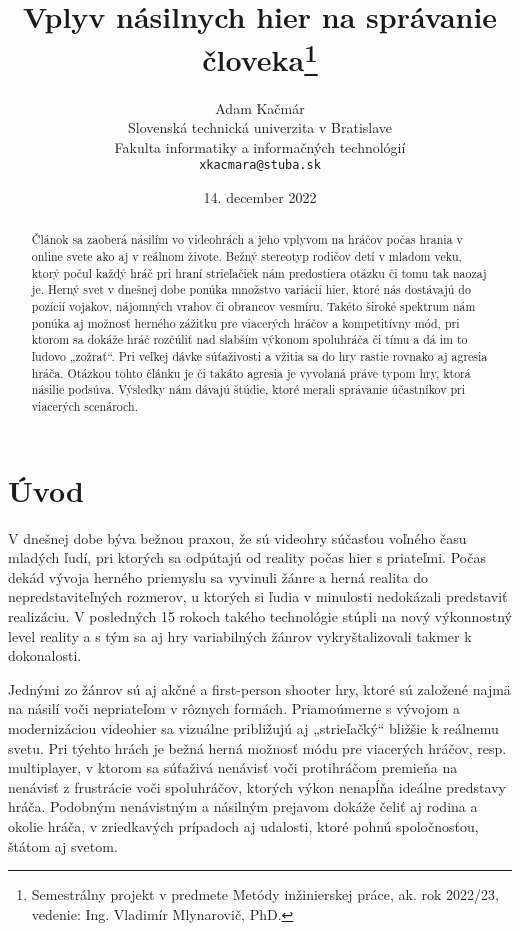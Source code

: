 \documentclass[10pt,twoside,slovak,a4paper]{article}
\title{Vplyv násilnych hier na správanie človeka\thanks{Semestrálny projekt v predmete Metódy inžinierskej práce, ak. rok 2022/23, vedenie: Ing. Vladimír Mlynarovič, PhD.}} %
\author{Adam Kačmár\\[2pt]
	{\small Slovenská technická univerzita v Bratislave}\\
	{\small Fakulta informatiky a informačných technológií}\\
	{\small \texttt{xkacmara@stuba.sk}}
	}
\date{\small 14. december 2022} %
\begin{document}
\maketitle

\begin{abstract}
Článok sa zaoberá násilím vo videohrách a jeho vplyvom na hráčov počas hrania v online svete ako aj v reálnom živote. Bežný stereotyp rodičov detí v mladom veku, ktorý počul každý hráč pri hraní strieľačiek nám predostiera otázku či tomu tak naozaj je. Herný svet v dnešnej dobe ponúka množstvo variácií hier, ktoré nás dostávajú do pozícií vojakov, nájomných vrahov či obrancov vesmíru. Takéto široké spektrum nám ponúka aj možnosť herného zážitku pre viacerých hráčov a kompetitívny mód, pri ktorom sa dokáže hráč rozčúliť nad slabším výkonom spoluhráča či tímu a dá im to ľudovo „zožrať“. Pri veľkej dávke súťaživosti a vžitia sa do hry rastie rovnako aj agresia hráča. Otázkou tohto článku je či takáto agresia je vyvolaná práve typom hry, ktorá násilie podsúva. Výsledky nám dávajú štúdie, ktoré merali správanie účastníkov pri viacerých scenároch.
\end{abstract}



\section{Úvod}

V dnešnej dobe býva bežnou praxou, že sú videohry súčasťou voľného času mladých ľudí, pri ktorých sa odpútajú od reality počas hier s priateľmi. Počas dekád vývoja herného priemyslu sa vyvinuli žánre a herná realita do nepredstaviteľných rozmerov, u ktorých si ľudia v minulosti nedokázali predstaviť realizáciu. V posledných 15 rokoch takého technológie stúpli na nový výkonnostný level reality a s tým sa aj hry variabilných žánrov vykryštalizovali takmer k dokonalosti.

Jednými zo žánrov sú aj akčné a first-person shooter hry, ktoré sú založené najmä na násilí voči nepriateľom v rôznych formách. Priamoúmerne s vývojom a modernizáciou videohier sa vizuálne približujú aj „strieľačký“ bližšie k reálnemu svetu. Pri týchto hrách je bežná herná možnosť módu pre viacerých hráčov, resp. multiplayer, v ktorom sa súťaživá nenávisť voči protihráčom premieňa na nenávisť z frustrácie voči spoluhráčov, ktorých výkon nenapĺňa ideálne predstavy hráča. Podobným nenávistným a násilným prejavom dokáže čeliť aj rodina a okolie hráča, v zriedkavých prípadoch aj udalosti, ktoré pohnú spoločnosťou, štátom aj svetom. 
\end{document}
